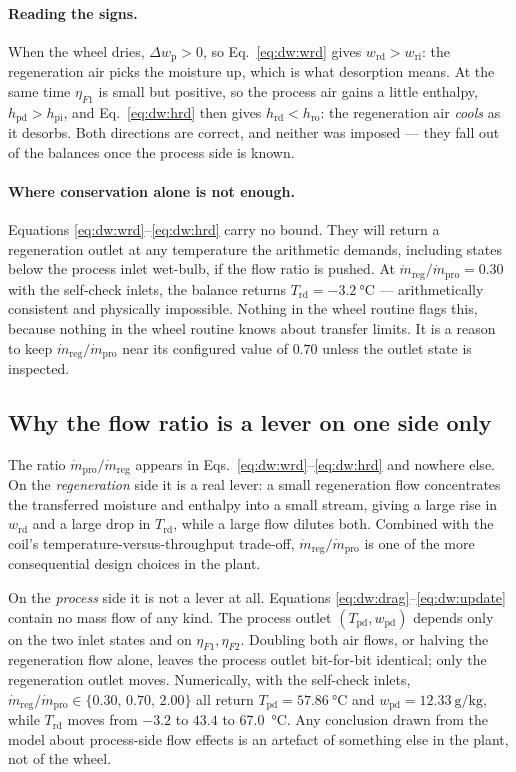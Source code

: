 \documentclass[11pt]{article}
\newcommand{\mdp}{\ensuremath{\dot m_{\mathrm{pro}}}}
\newcommand{\mdr}{\ensuremath{\dot m_{\mathrm{reg}}}}
\begin{document}
\paragraph{Reading the signs.} When the wheel dries,
$\Delta w_{\mathrm{p}}>0$, so Eq.~\eqref{eq:dw:wrd} gives
$w_{\mathrm{rd}}>w_{\mathrm{ri}}$: the regeneration air picks the moisture up,
which is what desorption means. At the same time $\eta_{F1}$ is small but
positive, so the process air gains a little enthalpy,
$h_{\mathrm{pd}}>h_{\mathrm{pi}}$, and Eq.~\eqref{eq:dw:hrd} then gives
$h_{\mathrm{rd}}<h_{\mathrm{ro}}$: the regeneration air \emph{cools} as it
desorbs. Both directions are correct, and neither was imposed --- they fall
out of the balances once the process side is known.

\paragraph{Where conservation alone is not enough.} Equations
\eqref{eq:dw:wrd}--\eqref{eq:dw:hrd} carry no bound. They will return a
regeneration outlet at any temperature the arithmetic demands, including
states below the process inlet wet-bulb, if the flow ratio is pushed. At
$\mdr/\mdp=0.30$ with the self-check inlets, the balance returns
$T_{\mathrm{rd}}=\SI{-3.2}{\degreeCelsius}$ --- arithmetically consistent and
physically impossible. Nothing in the wheel routine flags this, because
nothing in the wheel routine knows about transfer limits. It is a reason to
keep $\mdr/\mdp$ near its configured value of $0.70$ unless the outlet state
is inspected.

\subsection{Why the flow ratio is a lever on one side only}
\label{sec:dw:lever}

The ratio $\mdp/\mdr$ appears in Eqs.~\eqref{eq:dw:wrd}--\eqref{eq:dw:hrd}
and nowhere else. On the \emph{regeneration} side it is a real lever: a small
regeneration flow concentrates the transferred moisture and enthalpy into a
small stream, giving a large rise in $w_{\mathrm{rd}}$ and a large drop in
$T_{\mathrm{rd}}$, while a large flow dilutes both. Combined with the coil's
temperature-versus-throughput trade-off, $\mdr/\mdp$ is one of the more
consequential design choices in the plant.

On the \emph{process} side it is not a lever at all. Equations
\eqref{eq:dw:drag}--\eqref{eq:dw:update} contain no mass flow of any kind.
The process outlet $(T_{\mathrm{pd}},w_{\mathrm{pd}})$ depends only on the two
inlet states and on $\eta_{F1},\eta_{F2}$. Doubling both air flows, or
halving the regeneration flow alone, leaves the process outlet bit-for-bit
identical; only the regeneration outlet moves. Numerically, with the
self-check inlets, $\mdr/\mdp \in \{0.30,\,0.70,\,2.00\}$ all return
$T_{\mathrm{pd}}=\SI{57.86}{\degreeCelsius}$ and
$w_{\mathrm{pd}}=\SI{12.33}{\gram\per\kilogram}$, while $T_{\mathrm{rd}}$
moves from $-3.2$ to $43.4$ to \SI{67.0}{\degreeCelsius}. Any conclusion
drawn from the model about process-side flow effects is an artefact of
something else in the plant, not of the wheel.
\end{document}
